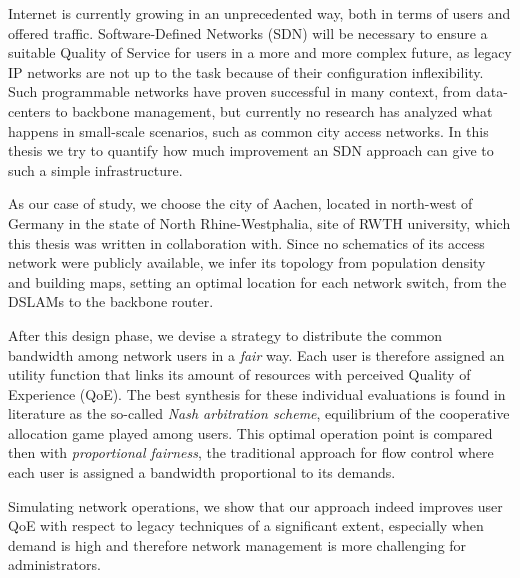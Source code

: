 
Internet is currently growing in an unprecedented way, both in terms of users
and offered traffic. %
%
Software-Defined Networks (SDN) will be necessary to ensure a suitable Quality
of Service for users in a more and more complex future, as legacy IP networks
are not up to the task because of their configuration inflexibility. %
%
Such programmable networks have proven successful in many context, from
data-centers to backbone management, but currently no research has analyzed what
happens in small-scale scenarios, such as common city access networks. In this
thesis we try to quantify how much improvement an SDN approach can give to such
a simple infrastructure.

\smallskip

As our case of study, we choose the city of Aachen, located in north-west of
Germany in the state of North Rhine-Westphalia, site of RWTH
university, which this thesis was written in collaboration with. %
%
Since no schematics of its access network were publicly available, we infer its
topology from population density and building maps, setting an optimal location
for each network switch, from the DSLAMs to the backbone router.


After this design phase, we devise a strategy to distribute the common bandwidth
among network users in a \emph{fair} way. %
%
Each user is therefore assigned an utility function that links its amount of
resources with perceived Quality of Experience (QoE). %
%
The best synthesis for these individual evaluations is found in literature as
the so-called \emph{Nash arbitration scheme}, equilibrium of the cooperative
allocation game played among users.%
%
This optimal operation point is compared then with \emph{proportional fairness},
the traditional approach for flow control where each user is assigned a
bandwidth proportional to its demands.

Simulating network operations, we show that our approach indeed improves user
QoE with respect to legacy techniques of a significant extent, especially when
demand is high and therefore network management is more challenging for
administrators.

